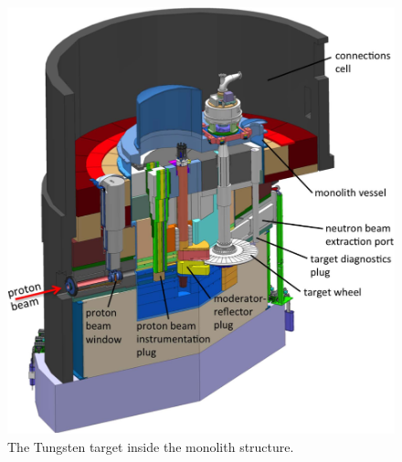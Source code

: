 \begin{figure}[!ht]
	\begin{center}
		\includegraphics[width=\textwidth]{02_BeamDiag/figures/fig000_ESS_target_b}
	\end{center}
	\caption[The Tungsten target inside the monolith structure]{The Tungsten target inside the monolith structure.}
	\label{chap2:fig:target}
\end{figure}
